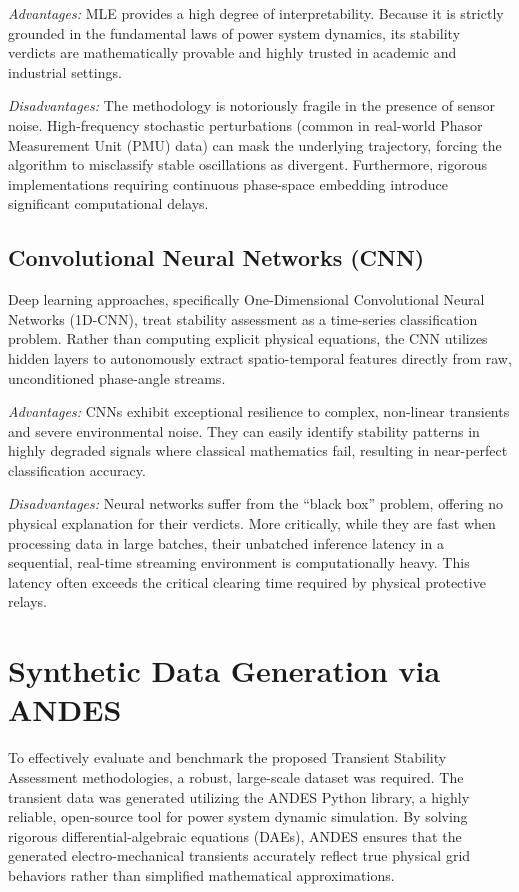 \documentclass[conference]{IEEEtran}
\begin{document}
\textit{Advantages:} MLE provides a high degree of interpretability. Because it is strictly grounded in the fundamental laws of power system dynamics, its stability verdicts are mathematically provable and highly trusted in academic and industrial settings.

\textit{Disadvantages:} The methodology is notoriously fragile in the presence of sensor noise. High-frequency stochastic perturbations (common in real-world Phasor Measurement Unit (PMU) data) can mask the underlying trajectory, forcing the algorithm to misclassify stable oscillations as divergent. Furthermore, rigorous implementations requiring continuous phase-space embedding introduce significant computational delays.

\subsection{Convolutional Neural Networks (CNN)}
Deep learning approaches, specifically One-Dimensional Convolutional Neural Networks (1D-CNN), treat stability assessment as a time-series classification problem. Rather than computing explicit physical equations, the CNN utilizes hidden layers to autonomously extract spatio-temporal features directly from raw, unconditioned phase-angle streams.

\textit{Advantages:} CNNs exhibit exceptional resilience to complex, non-linear transients and severe environmental noise. They can easily identify stability patterns in highly degraded signals where classical mathematics fail, resulting in near-perfect classification accuracy.

\textit{Disadvantages:} Neural networks suffer from the ``black box'' problem, offering no physical explanation for their verdicts. More critically, while they are fast when processing data in large batches, their unbatched inference latency in a sequential, real-time streaming environment is computationally heavy. This latency often exceeds the critical clearing time required by physical protective relays.

\section{Synthetic Data Generation via ANDES}
To effectively evaluate and benchmark the proposed Transient Stability Assessment methodologies, a robust, large-scale dataset was required. The transient data was generated utilizing the ANDES Python library, a highly reliable, open-source tool for power system dynamic simulation. By solving rigorous differential-algebraic equations (DAEs), ANDES ensures that the generated electro-mechanical transients accurately reflect true physical grid behaviors rather than simplified mathematical approximations.
\end{document}
